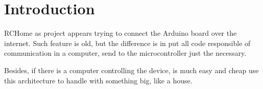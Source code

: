 
\section*{Introduction}

RCHome as project appears trying to connect the Arduino board over the internet.
Such feature is old, but the difference is in put all code responsible of
communication in a computer, send to the microcontroller just the necessary.

Besides, if there is a computer controlling the device, is much easy and cheap
use this architecture to handle with something big, like a house.
